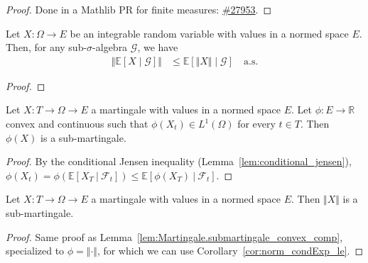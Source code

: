 \begin{proof}
Done in a Mathlib PR for finite measures: \href{https://github.com/leanprover-community/mathlib4/pull/27953}{\#27953}.
\end{proof}


\begin{corollary}\label{cor:norm_condExp_le}
  \leanok
Let $X : \Omega \to E$ be an integrable random variable with values in a normed space $E$.
Then, for any sub-$\sigma$-algebra $\mathcal{G}$, we have
\begin{align*}
  \Vert \mathbb{E}[X \mid \mathcal{G}] \Vert
  &\le \mathbb{E}[\Vert X \Vert \mid \mathcal{G}] \quad \text{a.s.}
\end{align*}
\end{corollary}

\begin{proof}
  \leanok

\end{proof}


\begin{lemma}\label{lem:Martingale.submartingale_convex_comp}
  \leanok
Let $X : T \rightarrow \Omega\rightarrow E$ a martingale with values in a normed space $E$.
Let $\phi : E \rightarrow \mathbb{R}$ convex and continuous such that
$\phi(X_t)\in L^1(\Omega)$ for every $t\in T$. Then $\phi(X)$ is a sub-martingale.
\end{lemma}

\begin{proof}
  \leanok
  By the conditional Jensen inequality (Lemma~\ref{lem:conditional_jensen}),
  $\phi(X_t) = \phi\left( \mathbb{E}[X_T\ |\ \mathcal{F}_t] \right)\leq \mathbb{E}[\phi(X_T)\ |\ \mathcal{F}_t]$.
\end{proof}


\begin{corollary}\label{cor:Martingale.submartingale_norm}
  \leanok
  Let $X : T \rightarrow \Omega \rightarrow E$ a martingale with values in a normed space $E$.
  Then $\Vert X \Vert$ is a sub-martingale.
\end{corollary}

\begin{proof}
  \leanok
Same proof as Lemma~\ref{lem:Martingale.submartingale_convex_comp}, specialized to $\phi = \Vert \cdot \Vert$, for which we can use Corollary~\ref{cor:norm_condExp_le}.
\end{proof}


